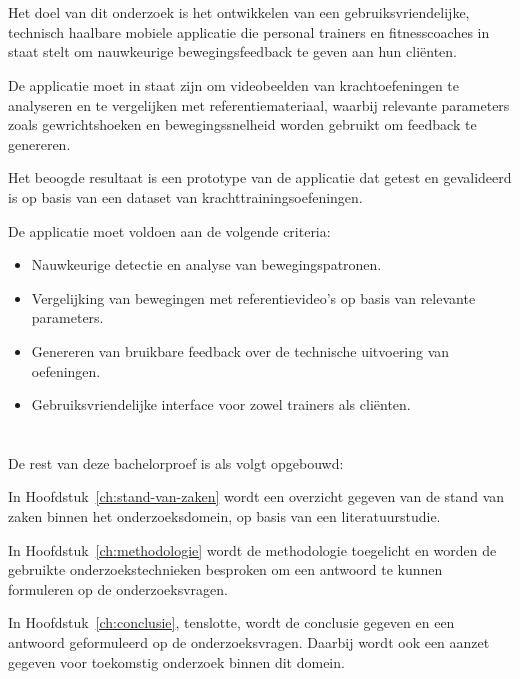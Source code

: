 \section{}%
\label{sec:onderzoeksdoelstelling}

Het doel van dit onderzoek is het ontwikkelen van een gebruiksvriendelijke, \mbox{technisch} haalbare mobiele applicatie die personal trainers en fitnesscoaches in staat stelt om nauwkeurige bewegingsfeedback te geven aan hun cliënten. 

\medskip

De applicatie moet in staat zijn om videobeelden van krachtoefeningen te analyseren en te vergelijken met referentiemateriaal, waarbij relevante parameters zoals gewrichtshoeken en bewegingssnelheid worden gebruikt om feedback te genereren.

\medskip

Het beoogde resultaat is een prototype van de applicatie dat getest en gevalideerd is op basis van een dataset van krachttrainingsoefeningen. 

\medskip

De applicatie moet voldoen aan de volgende criteria:
\begin{itemize}
    \item Nauwkeurige detectie en analyse van bewegingspatronen.
    \item Vergelijking van bewegingen met referentievideo’s op basis van relevante parameters.
    \item Genereren van bruikbare feedback over de technische uitvoering van oefeningen.
    \item Gebruiksvriendelijke interface voor zowel trainers als cliënten.
\end{itemize}

\section{}%
\label{sec:opzet-bachelorproef}


De rest van deze bachelorproef is als volgt opgebouwd:

In Hoofdstuk~\ref{ch:stand-van-zaken} wordt een overzicht gegeven van de stand van zaken binnen het onderzoeksdomein, op basis van een literatuurstudie.

In Hoofdstuk~\ref{ch:methodologie} wordt de methodologie toegelicht en worden de gebruikte onderzoekstechnieken besproken om een antwoord te kunnen formuleren op de onderzoeksvragen.


In Hoofdstuk~\ref{ch:conclusie}, tenslotte, wordt de conclusie gegeven en een antwoord geformuleerd op de onderzoeksvragen. Daarbij wordt ook een aanzet gegeven voor toekomstig onderzoek binnen dit domein.